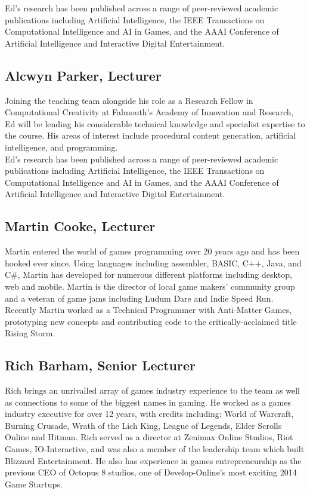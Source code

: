 Ed's research has been published across a range of peer-reviewed academic publications including Artificial Intelligence, the IEEE Transactions on Computational Intelligence and AI in Games, and the AAAI Conference of Artificial Intelligence and Interactive Digital Entertainment. \\

\subsection{Alcwyn Parker, Lecturer}

Joining the teaching team alongside his role as a Research Fellow in Computational Creativity at Falmouth's Academy of Innovation and Research, Ed will be lending his considerable technical knowledge and specialist expertise to the course. His areas of interest include procedural content generation, artificial intelligence, and programming. \\

Ed's research has been published across a range of peer-reviewed academic publications including Artificial Intelligence, the IEEE Transactions on Computational Intelligence and AI in Games, and the AAAI Conference of Artificial Intelligence and Interactive Digital Entertainment. \\

\subsection{Martin Cooke, Lecturer}

Martin entered the world of games programming over 20 years ago and has been hooked ever since. Using languages including assembler, BASIC, C++, Java, and C\#, Martin has developed for numerous different platforms including desktop, web and mobile. Martin is the director of local game makers’ community group and a veteran of game jams including Ludum Dare and Indie Speed Run. Recently Martin worked as a Technical Programmer with Anti-Matter Games, prototyping new concepts and contributing code to the critically-acclaimed title Rising Storm.\\

\subsection{Rich Barham, Senior Lecturer}

Rich brings an unrivalled array of games industry experience to the team as well as connections to some of the biggest names in gaming.  He worked as a games industry executive for over 12 years, with credits including: World of Warcraft, Burning Crusade, Wrath of the Lich King, League of Legends, Elder Scrolls Online and Hitman. Rich served as a director at Zenimax Online Studios, Riot Games, IO-Interactive, and was also a member of the leadership team which built Blizzard Entertainment. He also has experience in games entrepreneurship as the previous CEO of Octopus 8 studios, one of Develop-Online's most exciting 2014 Game Startups.\\

